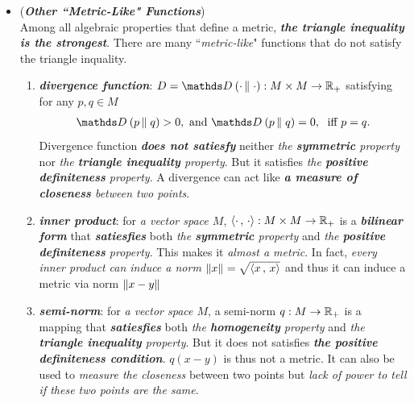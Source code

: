 \documentclass[11pt]{article}
\begin{document}
\begin{itemize}
\item \begin{remark} (\emph{\textbf{Other ``Metric-Like" Functions}})\\
Among all algebraic properties that define a metric, \emph{\textbf{the triangle inequality is the strongest}}. There are many ``\emph{metric-like}" functions that do not satisfy the triangle inquality. 
\begin{enumerate}
\item \emph{\textbf{divergence function}}: $D = \divg{}{\cdot}{\cdot}: M \times M  \rightarrow  \bR_{+}$ satisfying for any $p,q \in M$
\begin{align*}
\divg{}{p}{q} > 0,  \text{ and }  \divg{}{p}{q} = 0, \; \text{ iff }p=q.
\end{align*} 
Divergence function \emph{\textbf{does not satiesfy}} neither \emph{the \textbf{symmetric} property} nor \emph{the \textbf{triangle inequality} property}. But it satisfies \emph{the \textbf{positive definiteness} property}. A divergence can act like \emph{\textbf{a measure of closeness} between two points}.

\item \textit{\textbf{inner product}}: for \emph{a vector space $M$}, $\left\langle \cdot\,,\, \cdot \right\rangle: M \times M \rightarrow {\mathbb R}_{+}$ is a \emph{\textbf{bilinear form}} that \emph{\textbf{satiesfies}} both  \emph{the \textbf{symmetric} property} and \emph{the \textbf{positive definiteness} property}. This makes it \emph{almost a metric}. In fact, \emph{every inner product can induce a \emph{norm} $\left\|x\right\|_{} = \sqrt{\left\langle x\,,\, x \right\rangle}$} and thus it can induce a metric via norm $\left\|x - y\right\|_{}$

\item \emph{\textbf{semi-norm}}: for \emph{a vector space $M$}, a semi-norm $q: M\rightarrow {\mathbb R}_{+}$ is a mapping that \emph{\textbf{satiesfies}} both  \emph{the \textbf{homogeneity} property} and \emph{the \textbf{triangle inequality} property}. But it does not satisfies \emph{\textbf{the positive definiteness condition}}. $q(x - y)$ is thus not a metric. It can also be used to \emph{measure the closeness} between two points but \emph{lack of power to tell if these two points are the same}.
\end{enumerate}
\end{remark}


\end{itemize}
\end{document}

